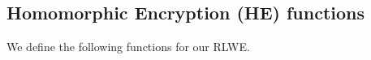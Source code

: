 \subsection{Homomorphic Encryption (HE) functions}
We define the following functions for our RLWE.




